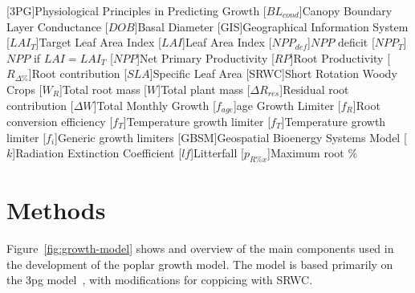 \documentclass[10pt]{article}
\begin{document}
[\textsc{3PG}]{Physiological Principles in Predicting Growth}
[\ensuremath{BL_{cond}}]{Canopy Boundary Layer Conductance}
[\ensuremath{DOB}]{Basal Diameter}
[\textsc{GIS}]{Geographical Information System}
[\ensuremath{LAI_{T}}]{Target Leaf Area Index}
[\ensuremath{LAI}]{Leaf Area Index}
[\ensuremath{NPP_{def}}]{$NPP$ deficit}
[\ensuremath{NPP_{T}}]{$NPP$ if $LAI = LAI_{T}$}
[\ensuremath{NPP}]{Net Primary Productivity}
[\ensuremath{RP}]{Root Productivity}
[\ensuremath{R_{\Delta\%}}]{Root contribution}
[\ensuremath{SLA}]{Specific Leaf Area}
[\textsc{SRWC}]{Short Rotation Woody Crops}
[\ensuremath{W_R}]{Total root mass}
[\ensuremath{W}]{Total plant mass}
[\ensuremath{\Delta R_{res}}]{Residual root contribution}
[\ensuremath{\Delta W}]{Total Monthly Growth}
[\ensuremath{f_{age}}]{age Growth Limiter}
[\ensuremath{f_R}]{Root conversion efficiency}
[\ensuremath{f_T}]{Temperature growth limiter}
[\ensuremath{f_T}]{Temperature growth limiter}
[\ensuremath{f_i}]{Generic growth limiters}
[\textsc{GBSM}]{Geospatial Bioenergy Systems Model}
[\ensuremath{k}]{Radiation Extinction Coefficient}
[\ensuremath{lf}]{Litterfall}
[\ensuremath{p_{R\%x}}]{Maximum root \%}

\section*{Methods}

Figure~\ref{fig:growth-model} shows and overview of the main
components used in the development of the poplar growth model. The
model is based primarily on the \acf{3pg} model~\cite{Landsberg1997,
  landsberg2010physiological}, with modifications for coppicing with
\ac{SRWC}.
\end{document}
